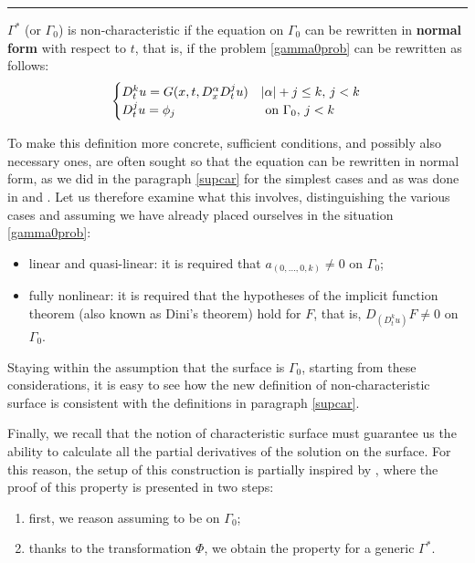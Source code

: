 \noindent\rule[0.5ex]{\linewidth}{0.2pt}

\begin{definition}
$\Gamma^*$ (or $\Gamma_0$) is non-characteristic if the equation on $\Gamma_0$ can be rewritten in \textbf{normal form} with respect to $t$, that is, if the problem \eqref{gamma0prob} can be rewritten as follows:
\begin{equation*}
\begin{cases}
D_{t}^k u = G(x,t, D^\alpha_x D^j_t u) & |\alpha |+ j \leq k, \, j<k \\ 
D_t^ju = \phi_j & \text{ on } \Gamma_0, \, j<k
\end{cases} \\
\end{equation*}
\end{definition}

To make this definition more concrete, sufficient conditions, and possibly also necessary ones, are often sought so that the equation can be rewritten in normal form, as we did in the paragraph \ref{supcar} for the simplest cases and as was done in \cite{Evans} and \cite{Folland}.
Let us therefore examine what this involves, distinguishing the various cases and assuming we have already placed ourselves in the situation \eqref{gamma0prob}:
\begin{itemize}
\item linear and quasi-linear: it is required that $a_{(0,\ldots ,0,k)} \neq 0$ on $\Gamma_0$;
\item fully nonlinear: it is required that the hypotheses of the implicit function theorem (also known as Dini's theorem) hold for $F$, that is, $D_{(D^k_t u)} F \neq 0$ on $\Gamma_0$.
\end{itemize}

\begin{remark}
Staying within the assumption that the surface is $\Gamma_0$, starting from these considerations, it is easy to see how the new definition of non-characteristic surface is consistent with the definitions in paragraph \ref{supcar}.
\end{remark}

Finally, we recall that the notion of characteristic surface must guarantee us the ability to calculate all the partial derivatives of the solution on the surface. For this reason, the setup of this construction is partially inspired by \cite[cap.3]{Evans}, where the proof of this property is presented in two steps:
\begin{enumerate}
\item first, we reason assuming to be on $\Gamma_0$;
\item thanks to the transformation $\Phi$, we obtain the property for a generic $\Gamma^*$.
\end{enumerate}


